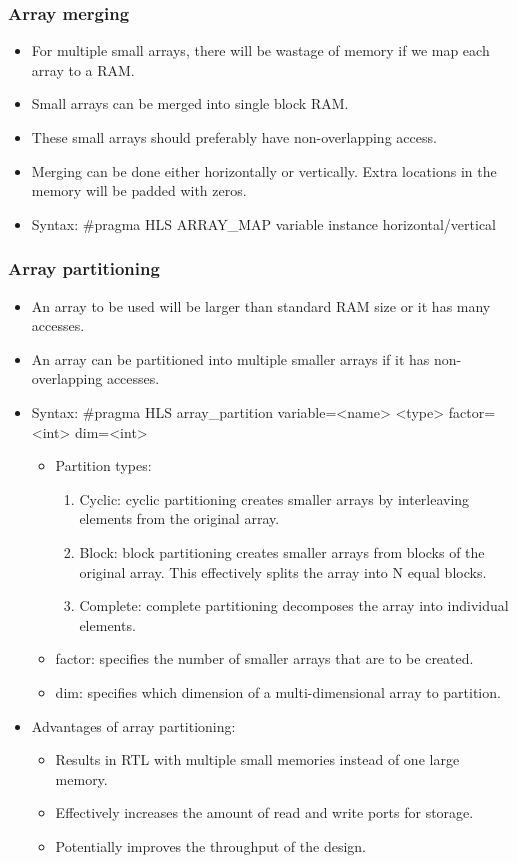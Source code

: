 \subsubsection{Array merging}
\begin{itemize}
  \item For multiple small arrays, there will be wastage of memory if we map each array to a RAM. 
  \item Small arrays can be merged into single block RAM.
  \item These small arrays should preferably have non-overlapping access.
  \item Merging can be done either horizontally or vertically. Extra locations in the memory will be padded with zeros.
  \item Syntax: \eg \#pragma HLS ARRAY\_MAP variable instance horizontal/vertical
\end{itemize}


\subsubsection{Array partitioning}
\begin{itemize}
  \item An array to be used will be larger than standard RAM size or it has many accesses.
  \item An array can be partitioned into multiple smaller arrays if it has non-overlapping accesses.
  \item Syntax: \eg \#pragma HLS array\_partition variable=<name> <type> factor=<int> dim=<int>
  
  \begin{itemize}
    \item Partition types: \begin{enumerate}
      \item Cyclic: cyclic partitioning creates smaller arrays by interleaving elements from the original array. 
      \item Block: block partitioning creates smaller arrays from blocks of the original array. This effectively splits the array into N equal blocks.
      \item Complete: complete partitioning decomposes the array into individual elements.
    \end{enumerate}
    \item factor: specifies the number of smaller arrays that are to be created.
    \item dim: specifies which dimension of a multi-dimensional array to partition.
  \end{itemize}
  \item Advantages of array partitioning: 
  \begin{itemize}
    \item Results in RTL with multiple small memories instead of one large memory.
    \item Effectively increases the amount of read and write ports for storage.
    \item Potentially improves the throughput of the design.
  \end{itemize}
\end{itemize}


